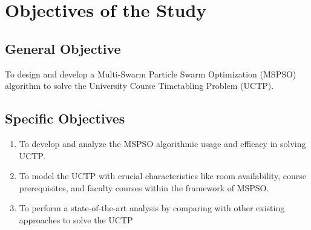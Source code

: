 \section{Objectives of the Study}
\label{sec:objectives}

\subsection{General Objective}
\label{subsec:generalobjective}

To design and develop a Multi-Swarm Particle Swarm Optimization (MSPSO) algorithm to solve the University Course Timetabling Problem (UCTP).

\subsection{Specific Objectives}
\label{subsec:specificobjectives}
\begin{enumerate}
    \item To develop and analyze the MSPSO algorithmic usage and efficacy in solving UCTP. 
    \item To model the UCTP with crucial characteristics like room availability, course prerequisites, and faculty courses within the framework of MSPSO. 
    \item To perform a state-of-the-art analysis by comparing with other existing approaches to solve the UCTP
\end{enumerate}
